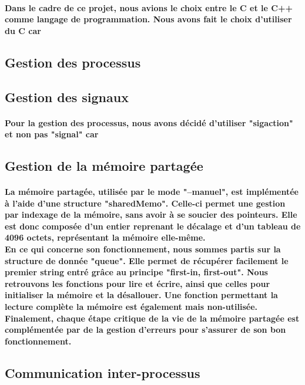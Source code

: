 \documentclass[utf8]{article}
\begin{document}
\paragraph{Dans le cadre de ce projet, nous avions le choix entre le C et le C++ comme langage de programmation.
Nous avons fait le choix d'utiliser du C car}
\subsection{Gestion des processus}
\paragraph{}
\subsection{Gestion des signaux}
\paragraph{Pour la gestion des processus, nous avons décidé d'utiliser "sigaction" et non pas "signal" car}
\subsection{Gestion de la mémoire partagée}
\paragraph{La mémoire partagée, utilisée par le mode "--manuel", est implémentée à l'aide d'une structure "sharedMemo". Celle-ci permet une gestion
par indexage de la mémoire, sans avoir à se soucier des pointeurs. Elle est donc composée d'un entier reprenant le décalage et d'un tableau de 4096 octets,
représentant la mémoire elle-même. \\En ce qui concerne son fonctionnement, nous sommes partis sur la structure de donnée "queue". Elle
permet de récupérer facilement le premier string entré grâce au principe "first-in, first-out". Nous retrouvons les fonctions pour lire et écrire, ainsi
que celles pour initialiser la mémoire et la désallouer. Une fonction permettant la lecture complète la mémoire est également mais non-utilisée.
Finalement, chaque étape critique de la vie de la mémoire partagée est complémentée par de la gestion d'erreurs pour s'assurer de son bon fonctionnement.}
\subsection{Communication inter-processus}
\end{document}
